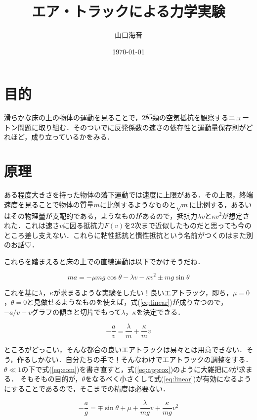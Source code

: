 \documentclass[uplatex,dvipdfmx,a4paper]{jsarticle}
\title{エア・トラックによる力学実験}
\author{山口海音}
\date{\today}
\begin{document}
\maketitle
\section{目的}
滑らかな床の上の物体の運動を見ることで，2種類の空気抵抗を観察するニュートン問題に取り組む．そのついでに反発係数の速さの依存性と運動量保存則がどれほど，成り立っているかをみる．

\section{原理}
ある程度大きさを持った物体の落下運動では速度に上限がある．その上限，終端速度を見ることで物体の質量$m$に比例するようなものと$\sqrt{m}$に比例する，あるいはその物理量が支配的である，ようなものがあるので，抵抗力$\lambda v$と$\kappa v^2$が想定された．これは速さ$v$に因る抵抗力$F(v)$を2次まで近似したものだと思っても今のところ差し支えない．これらに粘性抵抗と慣性抵抗という名前がつくのはまた別のお話♡．

これらを踏まえると床の上での直線運動は以下でかけそうだね．

\begin{equation}
    \label{eq:eom}
    ma = -\mu mg\cos\theta -\lambda v - \kappa v^2 \pm mg\sin\theta
\end{equation}

これを基に$\lambda$，$\kappa$が求まるような実験をしたい！良いエアトラック，即ち，$\mu=0$，$\theta=0$と見做せるようなものを使えば，式(\ref{eq:linear})が成り立つので，$-a/v - v$グラフの傾きと切片でもって$\lambda$，$\kappa$を決定できる．

\begin{equation}
    \label{eq:linear}
    -\frac{a}{v} = \frac{\lambda}{m} + \frac{\kappa}{m}v
\end{equation}

ところがどっこい，そんな都合の良いエアトラックは易々とは用意できない．そう，作るしかない．自分たちの手で！そんなわけでエアトラックの調整をする．$\theta\ll 1$の下で式(\ref{eq:eom})を書き直すと，式(\ref{eq:approx})のように大雑把に$\theta$が求まる．
そもそもの目的が，$\theta$をなるべく小さくして式(\ref{eq:linear})が有効になるようにすることであるので，そこまでの精度は必要ない．

\begin{equation}
    \label{eq:approx}
    -\frac{a}{g} = \mp\sin\theta + \mu  + \frac{\lambda}{mg}v + \frac{\kappa}{mg}v^2
\end{equation}
\end{document}
